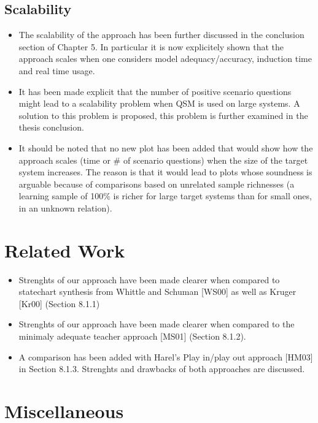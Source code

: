 \subsection*{Scalability}

\begin{itemize}
\item The scalability of the approach has been further discussed in the conclusion
    section of Chapter 5. In particular it is now explicitely shown that the 
    approach scales when one considers model adequacy/accuracy, induction time 
    and real time usage. 
\item It has been made explicit that the number of positive scenario questions 
    might lead to a scalability problem when QSM is used on large systems.
    A solution to this problem is proposed, this problem is further examined in
    the thesis conclusion.
\item It should be noted that no new plot has been added that would show how the 
    approach scales (time or \# of scenario questions) when the size of the 
    target system increases. The reason is that it would lead to plots whose 
    soundness is arguable because of comparisons based on unrelated sample 
    richnesses (a learning sample of 100\% is richer for large target systems 
    than for small ones, in an unknown relation).
\end{itemize}

\section*{Related Work}

\begin{itemize}
\item Strenghts of our approach have been made clearer when compared to statechart 
  synthesis from Whittle and Schuman [WS00] as well as Kruger [Kr00] (Section 
  8.1.1)
\item Strenghts of our approach have been made clearer when compared to the minimaly
  adequate teacher approach [MS01] (Section 8.1.2).
\item A comparison has been added with Harel's Play in/play out approach [HM03] in
  Section 8.1.3. Strenghts and drawbacks of both approaches are discussed.
\end{itemize}

\section*{Miscellaneous}

